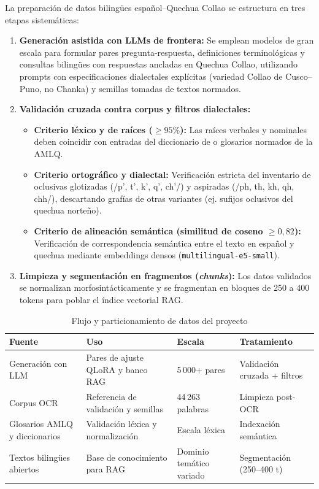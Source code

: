 La preparación de datos bilingües español--Quechua Collao se estructura en tres etapas sistemáticas:
\begin{enumerate}
    \item \textbf{Generación asistida con LLMs de frontera:} Se emplean modelos de gran escala para formular pares pregunta-respuesta, definiciones terminológicas y consultas bilingües con respuestas ancladas en Quechua Collao, utilizando prompts con especificaciones dialectales explícitas (variedad Collao de Cusco--Puno, no Chanka) y semillas tomadas de textos normados.
    \item \textbf{Validación cruzada contra corpus y filtros dialectales:}
        \begin{itemize}
            \item \textbf{Criterio léxico y de raíces ($\ge 95\%$):} Las raíces verbales y nominales deben coincidir con entradas del diccionario de \citet{Duran2026} o glosarios normados de la AMLQ.
            \item \textbf{Criterio ortográfico y dialectal:} Verificación estricta del inventario de oclusivas glotizadas (/p', t', k', q', ch'/) y aspiradas (/ph, th, kh, qh, chh/), descartando grafías de otras variantes (ej. sufijos oclusivos del quechua norteño).
            \item \textbf{Criterio de alineación semántica (similitud de coseno $\ge 0,82$):} Verificación de correspondencia semántica entre el texto en español y quechua mediante embeddings densos (\texttt{multilingual-e5-small}).
        \end{itemize}
    \item \textbf{Limpieza y segmentación en fragmentos (\textit{chunks}):} Los datos validados se normalizan morfosintácticamente y se fragmentan en bloques de 250 a 400 tokens para poblar el índice vectorial RAG.
\end{enumerate}

\begin{table}[H]
\centering
\caption{Flujo y particionamiento de datos del proyecto}
\label{tab:flujo_datos}
\small
\begin{tabular}{@{}p{3.5cm}p{4cm}p{3cm}p{3.5cm}@{}}
\toprule
\textbf{Fuente} & \textbf{Uso} & \textbf{Escala} & \textbf{Tratamiento} \\
\midrule
Generación con LLM & Pares de ajuste QLoRA y banco RAG & 5\,000+ pares & Validación cruzada + filtros \\
\midrule
Corpus OCR \citep{Orcotoma2025} & Referencia de validación y semillas & 44\,263 palabras & Limpieza post-OCR \\
\midrule
Glosarios AMLQ y diccionarios & Validación léxica y normalización & Escala léxica & Indexación semántica \\
\midrule
Textos bilingües abiertos & Base de conocimiento para RAG & Dominio temático variado & Segmentación (250--400 t) \\
\bottomrule
\end{tabular}
\end{table}

